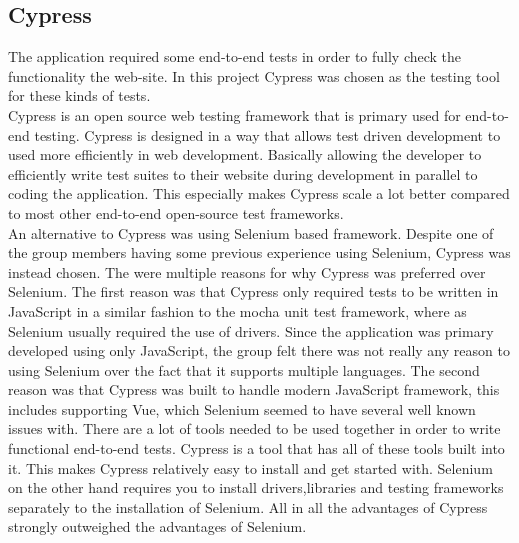 \subsection{Cypress}
The application required some end-to-end tests in order to fully check the functionality the web-site. In this project Cypress was chosen as the testing tool for these kinds of tests. \\[11pt]
Cypress is an open source web testing framework that is primary used for end-to-end testing. Cypress is designed in a way that allows test driven development to used more efficiently in web development. Basically allowing the developer to efficiently write test suites to their website during development in parallel to coding the application. This especially makes Cypress scale a lot better compared to most other end-to-end open-source test frameworks. \\[11pt]
An alternative to Cypress was using Selenium based framework. Despite one of the group members having some previous experience using Selenium, Cypress was instead chosen. The were multiple reasons for why Cypress was preferred over Selenium. The first reason was that Cypress only required tests to be written in JavaScript in a similar fashion to the mocha unit test framework, where as Selenium usually required the use of drivers. Since the application was primary developed using only JavaScript, the group felt there was not really any reason to using Selenium over the fact that it supports multiple languages. The second reason was that Cypress was built to handle modern JavaScript framework, this includes supporting Vue, which Selenium seemed to have several well known issues with. There are a lot of tools needed to be used together in order to write functional end-to-end tests. Cypress is a tool that has all of these tools built into it. This makes Cypress relatively easy to install and get started with. Selenium on the other hand requires you to install drivers,libraries and testing frameworks separately to the installation of Selenium. All in all the advantages of Cypress strongly outweighed the advantages of Selenium. \\[11pt]

